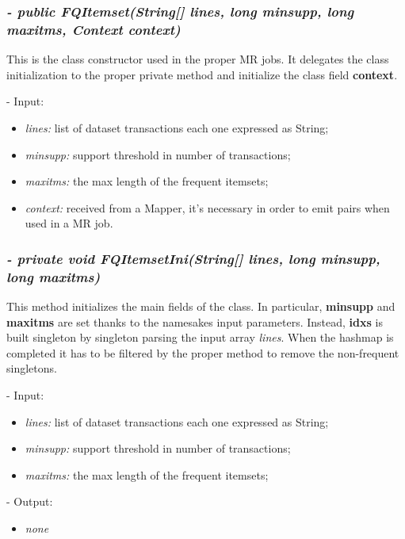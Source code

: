 \documentclass[]{report}
\begin{document}
	\subsubsection*{\textit{\textbf{-} public FQItemset(String[] lines, long minsupp, long maxitms, Context context)}}   	
	This is the class constructor used in the proper MR jobs. It delegates the class initialization to the proper private method and initialize the class field \textbf{context}.    
	\begin{description}
		\item - Input:
		\begin{itemize}
			\item \textit{lines:} list of dataset transactions each one expressed as String;
			\item \textit{minsupp:} support threshold in number of transactions;
			\item \textit{maxitms:} the max length of the frequent itemsets;
			\item \textit{context:} received from a Mapper, it's necessary in order to emit pairs when used in a MR job.
		\end{itemize}
	\end{description}

	\subsubsection*{\textit{\textbf{-} private void FQItemsetIni(String[] lines, long minsupp, long maxitms)}}   	
	This method initializes the main fields of the class. In particular, \textbf{minsupp} and \textbf{maxitms} are set thanks to the namesakes input parameters. Instead, \textbf{idxs} is built singleton by singleton parsing the input array \textit{lines}. When the hashmap is completed it has to be filtered by the proper method to remove the non-frequent singletons.   
	\begin{description}
		\item - Input:
		\begin{itemize}
			\item \textit{lines:} list of dataset transactions each one expressed as String;
			\item \textit{minsupp:} support threshold in number of transactions;
			\item \textit{maxitms:} the max length of the frequent itemsets;
		\end{itemize}
	\end{description}	
	\begin{description}
		\item - Output:
		\begin{itemize}
			\item \textit{none}  
		\end{itemize}
	\end{description}
	
\end{document}
